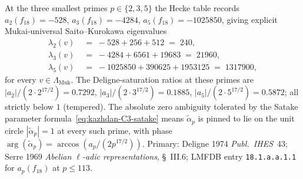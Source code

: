 \begin{remark}
\label{rem:dl-kazhdan-verification}
At the three smallest primes $p \in \{2, 3, 5\}$ the Hecke table
records $a_2(f_{18}) = -528$, $a_3(f_{18}) = -4284$,
$a_5(f_{18}) = -1025850$, giving explicit Mukai-universal
Saito--Kurokawa eigenvalues
\begin{align*}
 \lambda_2(v) &\;=\; -528 + 256 + 512 \;=\; 240,\\
 \lambda_3(v) &\;=\; -4284 + 6561 + 19683 \;=\; 21960,\\
 \lambda_5(v) &\;=\; -1025850 + 390625 + 1953125 \;=\; 1317900,
\end{align*}
for every $v \in \Lambda_{\mathrm{Muk}}$. The Deligne-saturation ratios
at these primes are $|a_2|/(2 \cdot 2^{17/2}) = 0.7292$,
$|a_3|/(2 \cdot 3^{17/2}) = 0.1885$, $|a_5|/(2 \cdot 5^{17/2}) = 0.5872$;
all strictly below $1$ (tempered). The absolute zero ambiguity tolerated
by the Satake parameter formula~\eqref{eq:kazhdan-C3-satake}
means $\tilde\alpha_p$ is pinned to lie on the unit circle
$|\tilde\alpha_p| = 1$ at every such prime, with phase
$\arg(\tilde\alpha_p) = \arccos(a_p / (2 p^{17/2}))$. Primary:
Deligne 1974 \emph{Publ.~IHES}~43; Serre 1969 \emph{Abelian
$\ell$-adic representations}, \S~III.6; LMFDB entry
\texttt{18.1.a.a.1.1} for $a_p(f_{18})$ at $p \le 113$.
\end{remark}

